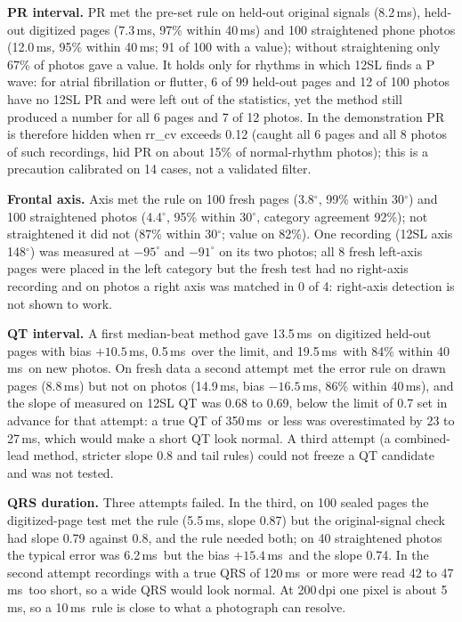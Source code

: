 \documentclass[11pt,a4paper]{article}
\newcommand{\ms}{\,ms}
\begin{document}
\textbf{PR interval.} PR met the pre-set rule on held-out original signals (8.2\ms), held-out digitized pages (7.3\ms, 97\% within 40\ms) and 100 straightened phone photos (12.0\ms, 95\% within 40\ms; 91 of 100 with a value); without straightening only 67\% of photos gave a value. It holds only for rhythms in which 12SL finds a P wave: for atrial fibrillation or flutter, 6 of 99 held-out pages and 12 of 100 photos have no 12SL PR and were left out of the statistics, yet the method still produced a number for all 6 pages and 7 of 12 photos. In the demonstration PR is therefore hidden when rr\_cv exceeds 0.12 (caught all 6 pages and all 8 photos of such recordings, hid PR on about 15\% of normal-rhythm photos); this is a precaution calibrated on 14 cases, not a validated filter.

\textbf{Frontal axis.} Axis met the rule on 100 fresh pages (3.8$^\circ$, 99\% within 30$^\circ$) and 100 straightened photos (4.4$^\circ$, 95\% within 30$^\circ$, category agreement 92\%); not straightened it did not (87\% within 30$^\circ$; value on 82\%). One recording (12SL axis 148$^\circ$) was measured at $-95^\circ$ and $-91^\circ$ on its two photos; all 8 fresh left-axis pages were placed in the left category but the fresh test had no right-axis recording and on photos a right axis was matched in 0 of 4: right-axis detection is not shown to work.

\textbf{QT interval.} A first median-beat method gave 13.5\ms\ on digitized held-out pages with bias $+10.5$\ms, 0.5\ms\ over the limit, and 19.5\ms\ with 84\% within 40\ms\ on new photos. On fresh data a second attempt met the error rule on drawn pages (8.8\ms) but not on photos (14.9\ms, bias $-16.5$\ms, 86\% within 40\ms), and the slope of measured on 12SL QT was 0.68 to 0.69, below the limit of 0.7 set in advance for that attempt: a true QT of 350\ms\ or less was overestimated by 23 to 27\ms, which would make a short QT look normal. A third attempt (a combined-lead method, stricter slope 0.8 and tail rules) could not freeze a QT candidate and was not tested.

\textbf{QRS duration.} Three attempts failed. In the third, on 100 sealed pages the digitized-page test met the rule (5.5\ms, slope 0.87) but the original-signal check had slope 0.79 against 0.8, and the rule needed both; on 40 straightened photos the typical error was 6.2\ms\ but the bias $+15.4$\ms\ and the slope 0.74. In the second attempt recordings with a true QRS of 120\ms\ or more were read 42 to 47\ms\ too short, so a wide QRS would look normal. At 200\,dpi one pixel is about 5\ms, so a 10\ms\ rule is close to what a photograph can resolve.
\end{document}
